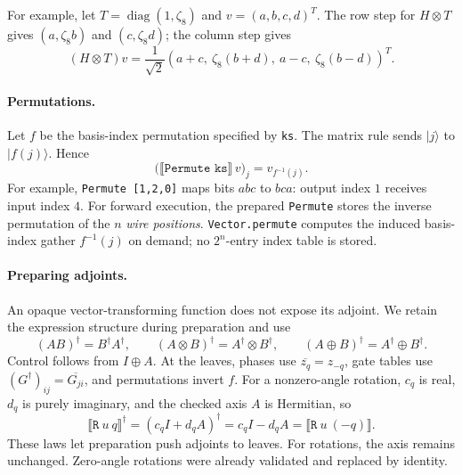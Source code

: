 \documentclass[11pt,a4paper]{article}
\newcommand{\sem}[1]{\llbracket #1\rrbracket}
\newcommand{\code}[1]{\texttt{#1}}
\newcommand{\ket}[1]{|#1\rangle}
\DeclareMathOperator{\diag}{diag}
\begin{document}
For example, let $T=\diag(1,\zeta_8)$ and $v=(a,b,c,d)^T$.
The row step for $H\otimes T$ gives $(a,\zeta_8b)$ and
$(c,\zeta_8d)$; the column step gives
\[
(H\otimes T)v=\frac1{\sqrt2}
(a+c,\ \zeta_8(b+d),\ a-c,\ \zeta_8(b-d))^T.
\]

\paragraph{Permutations.}
Let $f$ be the basis-index permutation specified by \code{ks}.
The matrix rule sends $\ket j$ to $\ket{f(j)}$. Hence
\[
\bigl(\sem{\code{Permute ks}}\,v\bigr)_j=v_{f^{-1}(j)}.
\]
For example, \code{Permute [1,2,0]} maps bits $abc$ to $bca$:
output index $1$ receives input index $4$.
For forward execution, the prepared \code{Permute} stores the inverse
permutation of the $n$ \emph{wire positions}. \code{Vector.permute} computes the induced
basis-index gather $f^{-1}(j)$ on demand; no $2^n$-entry index table is stored.

\paragraph{Preparing adjoints.}
An opaque vector-transforming function does not expose its adjoint.
We retain the expression structure during preparation and use
\[
(AB)^\dagger=B^\dagger A^\dagger,\qquad
(A\otimes B)^\dagger=A^\dagger\otimes B^\dagger,\qquad
(A\oplus B)^\dagger=A^\dagger\oplus B^\dagger.
\]
Control follows from $I\oplus A$. At the leaves, phases use
$\overline{z_q}=z_{-q}$, gate tables use
$(G^\dagger)_{ij}=\overline{G_{ji}}$, and permutations invert $f$.
For a nonzero-angle rotation, $c_q$ is real, $d_q$ is purely imaginary,
and the checked axis $A$ is Hermitian, so
\begin{equation}
\sem{\code{R}\ u\ q}^{\dagger}
=(c_qI+d_qA)^\dagger=c_qI-d_qA
=\sem{\code{R}\ u\ (-q)}.
\label{eq:svadjoint}
\end{equation}
These laws let preparation push adjoints to leaves. For rotations, the
axis remains unchanged. Zero-angle rotations were already validated
and replaced by identity.
\end{document}
